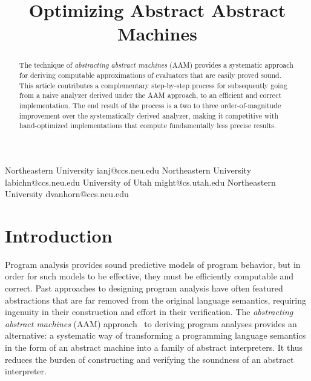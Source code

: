 \documentclass[9pt]{sigplanconf} %
\newcommand{\naive}{naive}
\begin{document}
\copyrightdata{[to be supplied]}


\title{Optimizing Abstract Abstract Machines}

           {Northeastern University}
           {ianj@ccs.neu.edu}
           {Northeastern University}
           {labichn@ccs.neu.edu}
           {University of Utah}
           {might@cs.utah.edu}
           {Northeastern University}
           {dvanhorn@ccs.neu.edu}
\maketitle

\begin{abstract}
The technique of \emph{abstracting abstract machines} (AAM) provides a systematic approach for deriving computable approximations of evaluators that are easily proved sound.
%
This article contributes a complementary step-by-step process for subsequently going from a \naive{} analyzer derived under the AAM approach, to an efficient and correct implementation.
%
The end result of the process is a two to three order-of-magnitude improvement over the systematically derived analyzer, making it competitive with hand-optimized implementations that compute fundamentally less precise results.
\end{abstract}




\section{Introduction}

Program analysis provides sound predictive models of program behavior, but in order for such models to be effective, they must be efficiently computable and correct.
%
Past approaches to designing program analysis have often featured abstractions that are far removed from the original language semantics, requiring ingenuity in their construction and effort in their verification.
%
The \emph{abstracting abstract machines} (AAM) approach~\cite{dvanhorn:VanHorn2011Abstracting,dvanhorn:VanHorn2012Systematic} to deriving program analyses provides an alternative: a systematic way of transforming a programming language semantics in the form of an abstract machine into a family of abstract interpreters.
%
It thus reduces the burden of constructing and verifying the soundness of an abstract interpreter.
%
\end{document}
